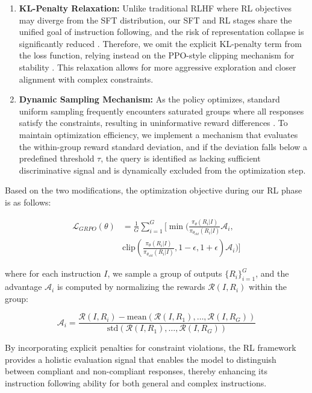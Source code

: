 \begin{enumerate}[leftmargin=4mm]
    \item \textbf{KL-Penalty Relaxation:} Unlike traditional RLHF where RL objectives may diverge from the SFT distribution, our SFT and RL stages share the unified goal of instruction following, and the risk of representation collapse is significantly reduced \citep{parthasarathi2025grpolambdacreditassignmentimproves}. Therefore, we omit the explicit KL-penalty term from the loss function, relying instead on the PPO-style clipping mechanism for stability \citep{hu2025openreasonerzeroopensourceapproach}. This relaxation allows for more aggressive exploration and closer alignment with complex constraints.
    \item \textbf{Dynamic Sampling Mechanism:} As the policy optimizes, standard uniform sampling frequently encounters saturated groups where all responses satisfy the constraints, resulting in uninformative reward differences \citep{yu2025dapo}. To maintain optimization efficiency, we implement a mechanism that evaluates the within-group reward standard deviation, and if the deviation falls below a predefined threshold $\tau$, the query is identified as lacking sufficient discriminative signal and is dynamically excluded from the optimization step.
\end{enumerate}

Based on the two modifications, the optimization objective during our RL phase is as follows:

\begin{equation}
\begin{split}
\mathcal{L}_{GRPO}(\theta) & = \frac{1}{G} \sum_{i=1}^{G} \bigg[ \min \Big( \frac{\pi_{\theta}(R_i|I)}{\pi_{\theta_{old}}(R_i|I)} \mathcal{A}_i, \\
& \text{clip}\left( \frac{\pi_{\theta}(R_i|I)}{\pi_{\theta_{old}}(R_i|I)}, 1-\epsilon, 1+\epsilon \right) \mathcal{A}_i \Big) \bigg]
\end{split}
\end{equation}

\noindent where for each instruction $I$, we sample a group of outputs $\{R_i\}_{i=1}^G$, and the advantage $\mathcal{A}_i$ is computed by normalizing the rewards $\mathcal{R}(I, R_i)$ within the group:

\begin{equation}
\mathcal{A}_i = \frac{\mathcal{R}(I, R_i) - \text{mean}(\mathcal{R}(I, R_1), \dots, \mathcal{R}(I, R_G))}{\text{std}(\mathcal{R}(I, R_1), \dots, \mathcal{R}(I, R_G))}
\end{equation}

By incorporating explicit penalties for constraint violations, the RL framework provides a holistic evaluation signal that enables the model to distinguish between compliant and non-compliant responses, thereby enhancing its instruction following ability for both general and complex instructions.